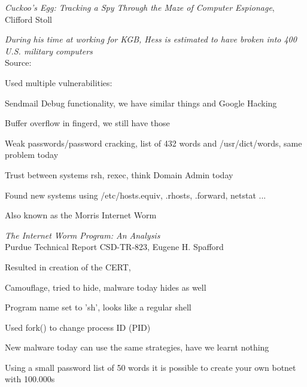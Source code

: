 \documentclass[Screen16to9,17pt,footrule]{foils}
\begin{document}
\begin{list1}
\item
\emph{Cuckoo's Egg: Tracking a Spy Through the Maze of Computer
 Espionage},\\  Clifford Stoll
\item \emph{During his time at working for KGB, Hess is estimated to have broken into 400 U.S. military computers}\\
Source: 
\end{list1}





\begin{list1}
\item Used multiple vulnerabilities:
\begin{list2}
\item Sendmail Debug functionality, we have similar things and Google Hacking
\item Buffer overflow in fingerd, we still have those
\item Weak passwords/password cracking, list of 432 words and /usr/dict/words, same problem today
\item Trust between systems rsh, rexec, think Domain Admin today
\item Found new systems using /etc/hosts.equiv, .rhosts, .forward, netstat ...
\end{list2}
\item Also known as the Morris Internet Worm
\item \emph{The Internet Worm Program: An Analysis}\\
Purdue Technical Report CSD-TR-823, Eugene H. Spafford
\item Resulted in creation of the CERT, 
\end{list1}


\begin{list1}
\item Camouflage, tried to hide, malware today hides as well
\begin{list2}
\item Program name set to 'sh', looks like a regular shell
\item Used fork() to change process ID (PID)
\end{list2}
\item New malware today can use the same strategies, have we learnt nothing
\item Using a small password list of 50 words it is possible to create your own botnet with 100.000s
\end{list1}
\end{document}
